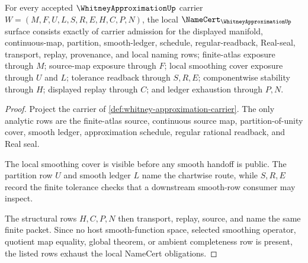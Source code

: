 \begin{theorem}
\label{thm:whitney-approximation-namecert-obligations}
For every accepted $\WhitneyApproximationUp$ carrier $W=(M,F,U,L,S,R,E,H,C,P,N)$, the local $\NameCert_{\WhitneyApproximationUp}$ surface consists exactly of carrier admission for the displayed manifold, continuous-map, partition, smooth-ledger, schedule, regular-readback, Real-seal, transport, replay, provenance, and local naming rows; finite-atlas exposure through $M$; source-map exposure through $F$; local smoothing cover exposure through $U$ and $L$; tolerance readback through $S,R,E$; componentwise stability through $H$; displayed replay through $C$; and ledger exhaustion through $P,N$.
\end{theorem}
\begin{proof}
Project the carrier of \autoref{def:whitney-approximation-carrier}. The only analytic rows are the finite-atlas source, continuous source map, partition-of-unity cover, smooth ledger, approximation schedule, regular rational readback, and Real seal.

The local smoothing cover is visible before any smooth handoff is public. The partition row $U$ and smooth ledger $L$ name the chartwise route, while $S,R,E$ record the finite tolerance checks that a downstream smooth-row consumer may inspect.

The structural rows $H,C,P,N$ then transport, replay, source, and name the same finite packet. Since no host smooth-function space, selected smoothing operator, quotient map equality, global theorem, or ambient completeness row is present, the listed rows exhaust the local NameCert obligations.
\end{proof}

